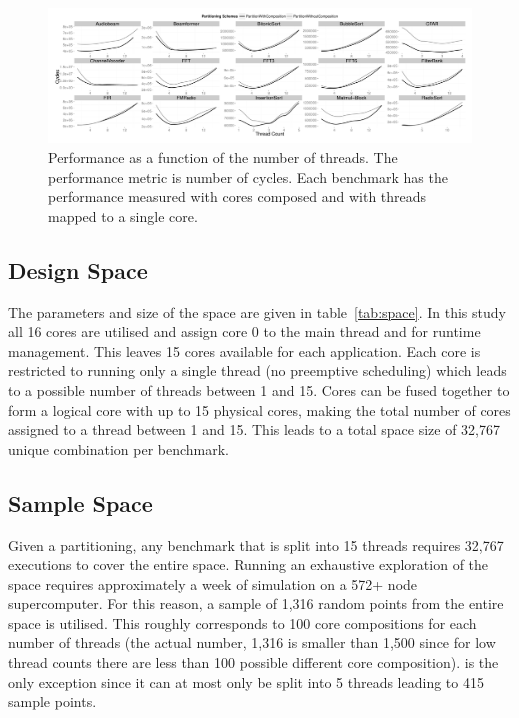 \begin{figure}[t]
 \centering
    \includegraphics[width=1\textwidth]{streamit-paper/graphics/threadingmaybe.pdf}
    \caption{Performance as a function of the number of threads. The performance metric is number of cycles. Each benchmark has the performance measured with cores composed and with threads mapped to a single core.}\label{fig:threadtrend}
\end{figure}


\subsection{Design Space}

The parameters and size of the space are given in table~\ref{tab:space}.
In this study all 16 cores are utilised and assign core 0 to the main thread and for runtime management. This leaves 15 cores available for each application.
Each core is restricted to running only a single thread (no preemptive scheduling) which leads to a possible number of threads between 1 and 15.
Cores can be fused together to form a logical core with up to 15 physical cores, making the total number of cores assigned to a thread between 1 and 15.
This leads to a total space size of 32,767 unique combination per benchmark.

\subsection{Sample Space}

Given a partitioning, any benchmark that is split into 15 threads requires 32,767 executions to cover the entire space.
Running an exhaustive exploration of the space requires approximately a week of simulation on a 572+ node supercomputer.
For this reason, a sample of 1,316 random points from the entire space is utilised.
This roughly corresponds to 100 core compositions for each number of threads (the actual number, 1,316 is smaller than 1,500 since for low thread counts there are less than 100 possible different core composition).
 is the only exception since it can at most only be split into 5 threads leading to 415 sample points.

